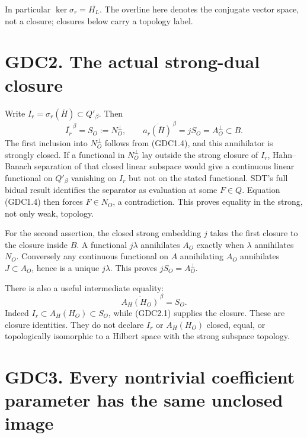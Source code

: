In particular \(\ker\sigma_r=\overline{H_L}\). The overline here denotes
the conjugate vector space, not a closure; closures below carry a
topology label.

\section{GDC2. The actual strong-dual
closure}\label{gdc2.-the-actual-strong-dual-closure}

Write \(I_r=\sigma_r(\overline H)\subset Q'_\beta\). Then \[
\boxed{\overline{I_r}^{\,\beta}=S_O:=N_O^\perp,\qquad
\overline{a_r(\overline H)}^{\,\beta}=jS_O=A_O^\perp\subset B.}
\tag{GDC2.1}
\] The first inclusion into \(N_O^\perp\) follows from (GDC1.4), and
this annihilator is strongly closed. If a functional in \(N_O^\perp\)
lay outside the strong closure of \(I_r\), Hahn--Banach separation of
that closed linear subspace would give a continuous linear functional on
\(Q'_\beta\) vanishing on \(I_r\) but not on the stated functional.
SDT's full bidual result identifies the separator as evaluation at some
\(F\in Q\). Equation (GDC1.4) then forces \(F\in N_O\), a contradiction.
This proves equality in the strong, not only weak, topology.

For the second assertion, the closed strong embedding \(j\) takes the
first closure to the closure inside \(B\). A functional \(j\lambda\)
annihilates \(A_O\) exactly when \(\lambda\) annihilates \(N_O\).
Conversely any continuous functional on \(A\) annihilating \(A_O\)
annihilates \(J\subset A_O\), hence is a unique \(j\lambda\). This
proves \(jS_O=A_O^\perp\).

There is also a useful intermediate equality: \[
\overline{A_H(H_O)}^{\,\beta}=S_O.
\tag{GDC2.2}
\] Indeed \(I_r\subset A_H(H_O)\subset S_O\), while (GDC2.1) supplies
the closure. These are closure identities. They do not declare \(I_r\)
or \(A_H(H_O)\) closed, equal, or topologically isomorphic to a Hilbert
space with the strong subspace topology.

\section{GDC3. Every nontrivial coefficient parameter has the same
unclosed
image}\label{gdc3.-every-nontrivial-coefficient-parameter-has-the-same-unclosed-image}

